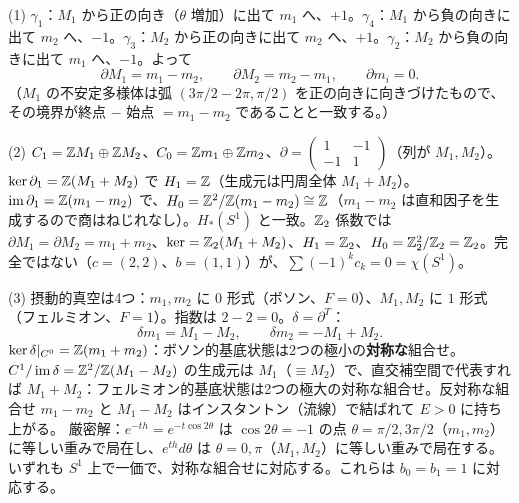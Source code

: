 \begin{solution}
(1) $\gamma_1$：$M_1$ から正の向き（$\theta$ 増加）に出て $m_1$ へ、$+1$。$\gamma_4$：$M_1$ から負の向きに出て $m_2$ へ、$-1$。$\gamma_3$：$M_2$ から正の向きに出て $m_2$ へ、$+1$。$\gamma_2$：$M_2$ から負の向きに出て $m_1$ へ、$-1$。よって
\[
\partial M_1=m_1-m_2,\qquad \partial M_2=m_2-m_1,\qquad \partial m_i=0 .
\]
（$M_1$ の不安定多様体は弧 $(3\pi/2-2\pi,\pi/2)$ を正の向きに向きづけたもので、その境界が終点 $-$ 始点 $=m_1-m_2$ であることと一致する。）

(2) $C_1=\mathbb{Z} M_1\oplus\mathbb{Z} M_2$、$C_0=\mathbb{Z} m_1\oplus\mathbb{Z} m_2$、$\partial=\begin{pmatrix}1&-1\\-1&1\end{pmatrix}$（列が $M_1,M_2$）。$\ker\partial_1=\mathbb{Z}(M_1+M_2)$ で $H_1=\mathbb{Z}$（生成元は円周全体 $M_1+M_2$）。$\operatorname{im}\partial_1=\mathbb{Z}(m_1-m_2)$ で、$H_0=\mathbb{Z}^2/\mathbb{Z}(m_1-m_2)\cong\mathbb{Z}$（$m_1-m_2$ は直和因子を生成するので商はねじれなし）。$H_*(S^1)$ と一致。$\mathbb{Z}_2$ 係数では $\partial M_1=\partial M_2=m_1+m_2$、$\ker=\mathbb{Z}_2(M_1+M_2)$、$H_1=\mathbb{Z}_2$、$H_0=\mathbb{Z}_2^2/\mathbb{Z}_2=\mathbb{Z}_2$。完全ではない（$c=(2,2)$、$b=(1,1)$）が、$\sum(-1)^kc_k=0=\chi(S^1)$。

(3) 摂動的真空は4つ：$m_1,m_2$ に $0$ 形式（ボソン、$F=0$）、$M_1,M_2$ に $1$ 形式（フェルミオン、$F=1$）。指数は $2-2=0$。$\delta=\partial^T$：
\[
\delta m_1=M_1-M_2,\qquad \delta m_2=-M_1+M_2 .
\]
$\ker\delta|_{C^0}=\mathbb{Z}(m_1+m_2)$：ボソン的基底状態は2つの極小の\textbf{対称な}組合せ。$C^1/\operatorname{im}\delta=\mathbb{Z}^2/\mathbb{Z}(M_1-M_2)$ の生成元は $M_1$（$\equiv M_2$）で、直交補空間で代表すれば $M_1+M_2$：フェルミオン的基底状態は2つの極大の対称な組合せ。反対称な組合せ $m_1-m_2$ と $M_1-M_2$ はインスタントン（流線）で結ばれて $E>0$ に持ち上がる。
厳密解：$e^{-th}=e^{-t\cos2\theta}$ は $\cos2\theta=-1$ の点 $\theta=\pi/2,3\pi/2$（$m_1,m_2$）に等しい重みで局在し、$e^{th}d\theta$ は $\theta=0,\pi$（$M_1,M_2$）に等しい重みで局在する。いずれも $S^1$ 上で一価で、対称な組合せに対応する。これらは $b_0=b_1=1$ に対応する。
\end{solution}


